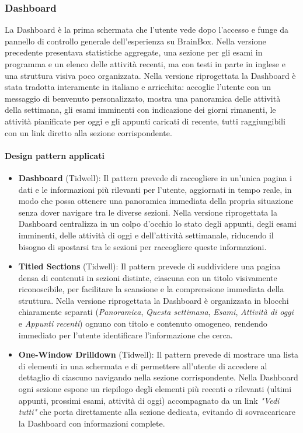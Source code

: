 \subsubsection{Dashboard}

La Dashboard è la prima schermata che l'utente vede dopo l'accesso e funge da pannello di controllo generale dell'esperienza su BrainBox. Nella versione precedente 
presentava statistiche aggregate, una sezione per gli esami in programma e un elenco delle attività recenti, ma con testi in parte in inglese e una struttura visiva poco organizzata. Nella versione riprogettata la Dashboard è stata tradotta interamente in italiano e arricchita: accoglie l'utente con un messaggio di benvenuto personalizzato, mostra una panoramica delle attività della settimana, gli esami imminenti con indicazione dei giorni rimanenti, le attività pianificate per oggi e gli appunti 
caricati di recente, tutti raggiungibili con un link diretto alla sezione corrispondente.

\paragraph{Design pattern applicati}

\begin{itemize}
    \item \textbf{Dashboard} (Tidwell): Il pattern prevede di raccogliere in un'unica 
    pagina i dati e le informazioni più rilevanti per l'utente, aggiornati in tempo reale, in modo che possa ottenere una panoramica immediata della propria situazione senza 
    dover navigare tra le diverse sezioni. Nella versione riprogettata la Dashboard centralizza in un colpo d'occhio lo stato degli appunti, degli esami imminenti, delle 
    attività di oggi e dell'attività settimanale, riducendo il bisogno di spostarsi tra le sezioni per raccogliere queste informazioni.

    \item \textbf{Titled Sections} (Tidwell): Il pattern prevede di suddividere una pagina densa di contenuti in sezioni distinte, ciascuna con un titolo visivamente riconoscibile, per facilitare la scansione e la comprensione immediata della struttura. Nella versione riprogettata la Dashboard è organizzata in blocchi chiaramente separati (\textit{Panoramica}, \textit{Questa settimana}, \textit{Esami}, 
    \textit{Attività di oggi} e \textit{Appunti recenti}) ognuno con titolo e contenuto omogeneo, rendendo immediato per l'utente identificare l'informazione che cerca.

    \item \textbf{One-Window Drilldown} (Tidwell): Il pattern prevede di mostrare una lista di elementi in una schermata e di permettere all'utente di accedere al dettaglio di ciascuno navigando nella sezione corrispondente. Nella Dashboard ogni sezione espone un riepilogo degli elementi più recenti o rilevanti (ultimi appunti, prossimi esami, attività di oggi) accompagnato da un link \textit{"Vedi tutti"} che porta direttamente alla sezione dedicata, evitando di sovraccaricare la Dashboard con informazioni complete.

\end{itemize}

